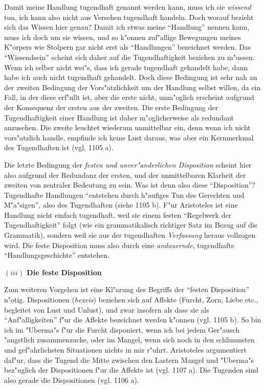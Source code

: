 \documentclass[a4paper, emulatestandardclasses, 12pt]{scrartcl}
\begin{document}
\begin{onehalfspace}
Damit meine Handlung tugendhaft genannt werden kann, muss ich sie \emph{wissend} tun, ich kann also nicht aus Versehen tugendhaft handeln. Doch worauf bezieht sich das Wissen hier genau? Damit ich etwas meine "`Handlung"' nennen kann, muss ich doch um sie wissen, und so k"onnen zuf"allige Bewegungen meines K"orpers wie Stolpern gar nicht erst als "`Handlungen"' bezeichnet werden. Das "`Wissendsein"' scheint sich daher auf die Tugendhaftigkeit beziehen zu m"ussen. Wenn ich selber nicht wei"s, dass ich gerade tugendhaft gehandelt habe, dann habe ich auch nicht tugendhaft gehandelt. Doch diese Bedingung ist sehr nah an der zweiten Bedingung der Vors"atzlichkeit um der Handlung selbst willen, da ein Fall, in der diese erf"ullt ist, aber die erste nicht, unm"oglich erscheint aufgrund der Konsequenz der ersten aus der zweiten. Die erste Bedingung der Tugendhaftigkeit einer Handlung ist daher m"oglicherweise als redundant anzusehen. Die zweite leuchtet wiederum unmittelbar ein, denn wenn ich nicht vors"atzlich handle, empfinde ich keine Lust daraus, was aber ein Kernmerkmal des Tugendhaften ist (vgl. 1105 a). 

Die letzte Bedingung der \emph{festen und unver"anderlichen Disposition} scheint hier also aufgrund der Redundanz der ersten, und der unmittelbaren Klarheit der zweiten von zentraler Bedeutung zu sein. Was ist denn also diese "`Disposition"'? Tugendhafte Handlungen "`entstehen durch h"aufiges Tun des Gerechten und M"a"sigen"', also des Tugendhaften (siehe 1105 b). F"ur Aristoteles ist eine Handlung nicht einfach tugendhaft, weil sie einem festen "`Regelwerk der Tugendhaftigkeit"' folgt (wie ein grammatikalisch richtiger Satz im Bezug auf die Grammatik), sondern weil sie aus der tugendhaften \emph{Verfassung} heraus vollzogen wird. Die feste Disposition muss also durch eine \emph{andauernde}, tugendhafte "`Handlungsgeschichte"' entstehen. 

\vspace{5mm}
\noindent\textbf{$(iii)$ Die feste Disposition}	

\noindent Zum weiteren Vorgehen ist eine Kl"arung des Begriffs der "`festen Disposition"'  n"otig. Dispositionen (\emph{hexeis}) beziehen sich auf Affekte (Furcht, Zorn, Liebe etc., begleitet von Lust und Unlust), und zwar insofern als dass sie als "`Anf"alligkeiten"' f"ur die Affekte bezeichnet werden k"onnen (vgl. 1105 b). So bin ich im "Uberma"s f"ur die Furcht disponiert, wenn ich bei jedem Ger"ausch "angstlich zusammenzucke, oder im Mangel, wenn sich noch in den schlimmsten und gef"ahrlichsten Situationen nichts in mir r"uhrt. Aristoteles argumentiert daf"ur, dass die Tugend die Mitte zwischen den Lastern Mangel und "Uberma"s bez"uglich der Dispositionen f"ur die Affekte ist (vgl. 1107 a). Die Tugenden sind also gerade die Dispositionen (vgl. 1106 a).


\end{onehalfspace}
\end{document}

